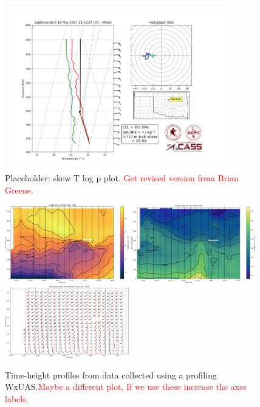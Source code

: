 \documentclass[sensors,review,submit,moreauthors,pdftex,10pt,a4paper]{mdpi}
\theoremstyle{mdpi}
\newcounter{ex}
\newcounter{re}
\theoremstyle{mdpidefinition}
\begin{document}
\begin{figure}
\centering
\includegraphics[angle=0, width=0.85\textwidth]{figures/skewT.pdf}
\caption{\label{fig:skewT_logp} Placeholder: skew T log p plot. \textcolor{red}{Get revised version from Brian Greene.}}
\end{figure}

\begin{figure}[htb]
\centering
\includegraphics[angle=0, width=0.48\textwidth]{figures/20171018-1018_Temperature.pdf}
\includegraphics[angle=0, width=0.48\textwidth]{figures/20171018-1018_Mixing.pdf}
\includegraphics[angle=0, width=0.48\textwidth]{figures/20171018-1018_Wind.pdf}
\caption{\label{fig:TimeHeightPlot} Time-height profiles from data collected using a profiling WxUAS.\textcolor{red}{Maybe a different plot. If we use these increase the axes labels.}}
\end{figure}
\end{document}
